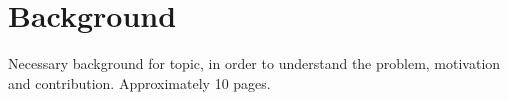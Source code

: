 \chapter{Background}
Necessary background for topic, in order to understand the problem, motivation and contribution. Approximately 10 pages.
